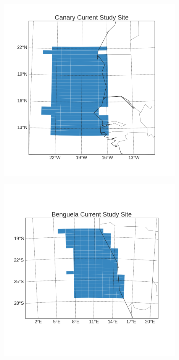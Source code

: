 \documentclass[12pt]{article}
\begin{document}
\begin{figure}[!h]
\begin{subfigure}[b]{0.4\textwidth}
    \end{subfigure} \\
    \begin{subfigure}[b]{0.4\textwidth}
        \centering
        \includegraphics[width=\linewidth]{../../figs/cancs/study-site/canary-current-study-site.png}
    \end{subfigure}
    \begin{subfigure}[b]{0.4\textwidth}
        \centering
        \includegraphics[width=\linewidth]{../../figs/bencs/study-site/benguela-current-study-site.png}

\end{subfigure}
\end{figure}
\end{document}
